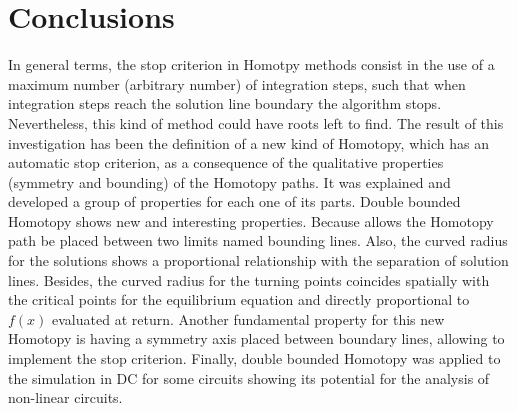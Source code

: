\documentclass[conference,letterpaper,onecolumn]{IEEEtran}
\begin{document}
\section{Conclusions}

In general terms, the stop criterion in Homotpy methods consist in the use of a maximum number (arbitrary number) of integration steps, such that when integration steps reach the solution line boundary the algorithm stops. Nevertheless, this kind of method could have roots left to find. The result of this investigation has been the definition of a new kind of Homotopy, which has an automatic stop criterion, as a consequence of the qualitative properties (symmetry and bounding) of the Homotopy paths. It was explained and developed a group of properties for each one of its parts. Double bounded Homotopy shows new and interesting properties. Because  allows the Homotopy path be placed between two limits named bounding lines. Also, the curved radius for the solutions shows a proportional relationship with the separation of solution lines. Besides, the curved radius for the turning points coincides spatially with the critical points for the equilibrium equation and directly proportional to $f(x)$ evaluated at return. Another fundamental property for this new Homotopy is having a symmetry axis placed between boundary lines, allowing to implement the stop criterion. Finally, double bounded Homotopy was applied to the simulation in DC for some circuits showing its potential for the analysis of non-linear circuits.



\end{document}
